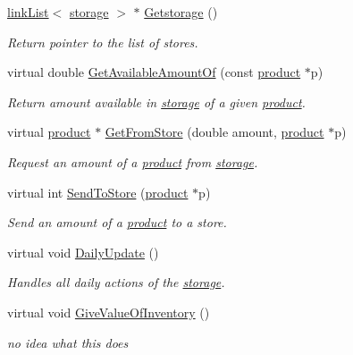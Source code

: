 \begin{DoxyCompactItemize}
\hyperlink{classlink_list}{linkList}$<$ \hyperlink{classstorage}{storage} $>$ $\ast$ \hyperlink{classbarn_storage_a8cae788f50f74e49bbaa5c1fbfc397a7}{Getstorage} ()
\begin{DoxyCompactList}\small\item\em Return pointer to the list of stores. \item\end{DoxyCompactList}\item 
virtual double \hyperlink{classbarn_storage_a37fc55dbb7648f0890efdc342a4d29e6}{GetAvailableAmountOf} (const \hyperlink{classproduct}{product} $\ast$p)
\begin{DoxyCompactList}\small\item\em Return amount available in \hyperlink{classstorage}{storage} of a given \hyperlink{classproduct}{product}. \item\end{DoxyCompactList}\item 
virtual \hyperlink{classproduct}{product} $\ast$ \hyperlink{classbarn_storage_a95bcaa3c5e29432ec990578e100f36d3}{GetFromStore} (double amount, \hyperlink{classproduct}{product} $\ast$p)
\begin{DoxyCompactList}\small\item\em Request an amount of a \hyperlink{classproduct}{product} from \hyperlink{classstorage}{storage}. \item\end{DoxyCompactList}\item 
virtual int \hyperlink{classbarn_storage_af10d75ac33adcdd0f6ebe63d25b9d2b3}{SendToStore} (\hyperlink{classproduct}{product} $\ast$p)
\begin{DoxyCompactList}\small\item\em Send an amount of a \hyperlink{classproduct}{product} to a store. \item\end{DoxyCompactList}\item 
virtual void \hyperlink{classbarn_storage_ac98e6005a3cb00a07d128931d2a6feb1}{DailyUpdate} ()
\begin{DoxyCompactList}\small\item\em Handles all daily actions of the \hyperlink{classstorage}{storage}. \item\end{DoxyCompactList}\item 
virtual void \hyperlink{classbarn_storage_a26ffc2da0bfc8f9efd9e0c75e42d22e2}{GiveValueOfInventory} ()
\begin{DoxyCompactList}\small\item\em no idea what this does \item\end{DoxyCompactList}\item 

\end{DoxyCompactItemize}
